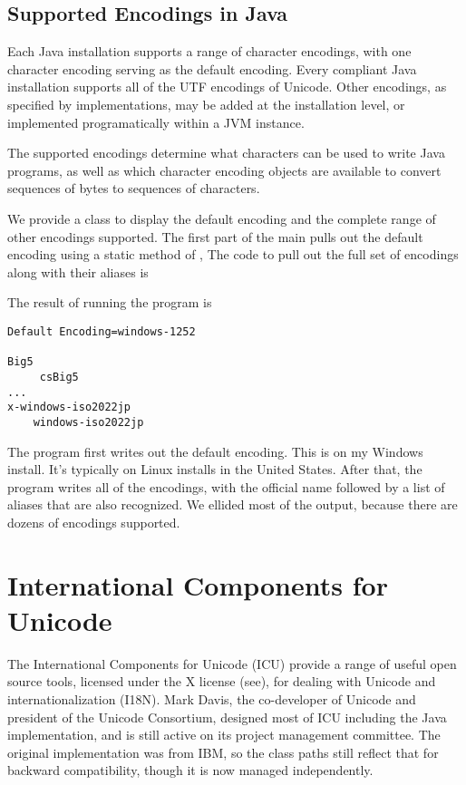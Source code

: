 \subsection{Supported Encodings in Java}\label{section:supported-encodings}

Each Java installation supports a range of character encodings, with
one character encoding serving as the default encoding.  Every
compliant Java installation supports all of the UTF encodings of
Unicode.  Other encodings, as specified by 
implementations, may be added at the installation level, or
implemented programatically within a JVM instance.

The supported encodings determine what characters can be used to write
Java programs, as well as which character encoding objects are
available to convert sequences of bytes to sequences of characters.

We provide a class  to
display the default encoding and the complete range of other encodings
supported.  The first part of the main pulls out the default encoding
using a static method of ,
%
%
The code to pull out the full set of encodings along with their
aliases is
%

The result of running the program is
%
\begin{verbatim}
Default Encoding=windows-1252

Big5
     csBig5
...
x-windows-iso2022jp
    windows-iso2022jp
\end{verbatim}
%
The program first writes out the default encoding.  This is
 on my Windows install.  It's typically
 on Linux installs in the United States.
After that, the program writes all of the encodings, with the official
name followed by a list of aliases that are also recognized.  We
ellided most of the output, because there are dozens of encodings
supported.


\section{International Components for Unicode}

The International Components for Unicode (ICU) provide a range of
useful open source tools, licensed under the X license
(see), for dealing with Unicode and
internationalization (I18N).  Mark Davis, the co-developer of Unicode
and president of the Unicode Consortium, designed most of ICU
including the Java implementation, and is still active on its project
management committee.  The original implementation was from IBM, so
the class paths still reflect that for backward compatibility, though
it is now managed independently.

